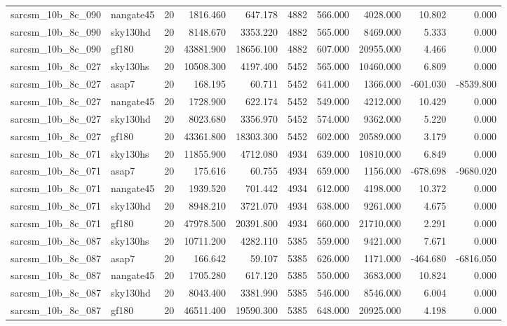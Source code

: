 \begin{tabular}{llrrrrrrrr}
sarcsm\_10b\_8c\_090 & nangate45 & 20 & 1816.460 & 647.178 & 4882 & 566.000 & 4028.000 & 10.802 & 0.000 \\
sarcsm\_10b\_8c\_090 & sky130hd & 20 & 8148.670 & 3353.220 & 4882 & 565.000 & 8469.000 & 5.333 & 0.000 \\
sarcsm\_10b\_8c\_090 & gf180 & 20 & 43881.900 & 18656.100 & 4882 & 607.000 & 20955.000 & 4.466 & 0.000 \\
sarcsm\_10b\_8c\_027 & sky130hs & 20 & 10508.300 & 4197.400 & 5452 & 565.000 & 10460.000 & 6.809 & 0.000 \\
sarcsm\_10b\_8c\_027 & asap7 & 20 & 168.195 & 60.711 & 5452 & 641.000 & 1366.000 & -601.030 & -8539.800 \\
sarcsm\_10b\_8c\_027 & nangate45 & 20 & 1728.900 & 622.174 & 5452 & 549.000 & 4212.000 & 10.429 & 0.000 \\
sarcsm\_10b\_8c\_027 & sky130hd & 20 & 8023.680 & 3356.970 & 5452 & 574.000 & 9362.000 & 5.220 & 0.000 \\
sarcsm\_10b\_8c\_027 & gf180 & 20 & 43361.800 & 18303.300 & 5452 & 602.000 & 20589.000 & 3.179 & 0.000 \\
sarcsm\_10b\_8c\_071 & sky130hs & 20 & 11855.900 & 4712.080 & 4934 & 639.000 & 10810.000 & 6.849 & 0.000 \\
sarcsm\_10b\_8c\_071 & asap7 & 20 & 175.616 & 60.755 & 4934 & 659.000 & 1156.000 & -678.698 & -9680.020 \\
sarcsm\_10b\_8c\_071 & nangate45 & 20 & 1939.520 & 701.442 & 4934 & 612.000 & 4198.000 & 10.372 & 0.000 \\
sarcsm\_10b\_8c\_071 & sky130hd & 20 & 8948.210 & 3721.070 & 4934 & 638.000 & 9261.000 & 4.675 & 0.000 \\
sarcsm\_10b\_8c\_071 & gf180 & 20 & 47978.500 & 20391.800 & 4934 & 660.000 & 21710.000 & 2.291 & 0.000 \\
sarcsm\_10b\_8c\_087 & sky130hs & 20 & 10711.200 & 4282.110 & 5385 & 559.000 & 9421.000 & 7.671 & 0.000 \\
sarcsm\_10b\_8c\_087 & asap7 & 20 & 166.642 & 59.107 & 5385 & 626.000 & 1171.000 & -464.680 & -6816.050 \\
sarcsm\_10b\_8c\_087 & nangate45 & 20 & 1705.280 & 617.120 & 5385 & 550.000 & 3683.000 & 10.824 & 0.000 \\
sarcsm\_10b\_8c\_087 & sky130hd & 20 & 8043.400 & 3381.990 & 5385 & 546.000 & 8546.000 & 6.004 & 0.000 \\
sarcsm\_10b\_8c\_087 & gf180 & 20 & 46511.400 & 19590.300 & 5385 & 648.000 & 20925.000 & 4.198 & 0.000 \\

\end{tabular}
